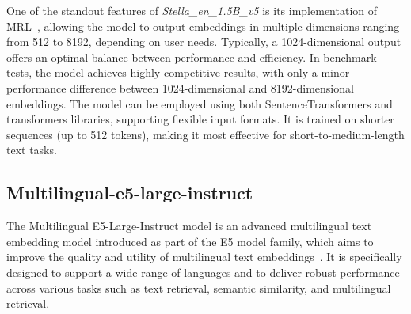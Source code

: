 One of the standout features of \textit{Stella\_en\_1.5B\_v5} is its implementation of \ac{MRL}~\cite{kusupati2024matryoshkarepresentationlearning}, allowing the model to output embeddings in multiple dimensions ranging from 512 to 8192, depending on user needs. 
Typically, a 1024-dimensional output offers an optimal balance between performance and efficiency. 
In benchmark tests, the model achieves highly competitive results, with only a minor performance difference between 1024-dimensional and 8192-dimensional embeddings.
The model can be employed using both SentenceTransformers and transformers libraries, supporting flexible input formats. 
It is trained on shorter sequences (up to 512 tokens), making it most effective for short-to-medium-length text tasks. 

\subsection{Multilingual-e5-large-instruct}\label{subsec:nextcloud-ai}
The Multilingual E5-Large-Instruct model is an advanced multilingual text embedding model introduced as part of the E5 model family, which aims to improve the quality and utility of multilingual text embeddings~\cite{wang2024multilinguale5textembeddings}.
It is specifically designed to support a wide range of languages and to deliver robust performance across various tasks such as text retrieval, semantic similarity, and multilingual retrieval.

